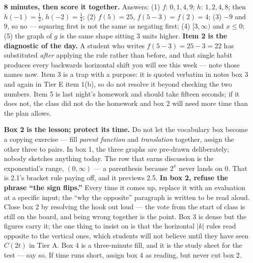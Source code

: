 \documentclass[10pt]{article}
\begin{document}
\boxguard[18]
\begin{teachernote}[Warm-Up]
    \textbf{8 minutes, then score it together.} Answers: (1) $f$: $0,1,4,9$; $h$: $1,2,4,8$; then
    $h(-1)=\tfrac12$, $h(-2)=\tfrac14$; (2) $f(5)=25$, $f(5-3)=f(2)=4$; (3) $-9$ and $9$, so no ---
    squaring first is not the same as negating first; (4) $[3,\infty)$ and $x \le 0$; (5) the graph
    of $g$ is the same shape sitting $3$ units higher. \textbf{Item 2 is the diagnostic of the
    day.} A student who writes $f(5-3)=25-3=22$ has substituted \emph{after} applying the rule
    rather than before, and that single habit produces every backwards horizontal shift you will
    see this week --- note those names now. Item 3 is a trap with a purpose: it is quoted verbatim
    in notes box 3 and again in Tier E item 1(b), so do not resolve it beyond checking the two
    numbers. Item 5 is last night's homework and should take fifteen seconds; if it does not, the
    class did not do the homework and box 2 will need more time than the plan allows.
\end{teachernote}

\boxguard[18]
\begin{teachernote}
    \textbf{Box 2 is the lesson; protect its time.} Do not let the vocabulary box become a copying
    exercise --- fill \emph{parent function} and \emph{translation} together, assign the other
    three to pairs. In box 1, the three graphs are pre-drawn deliberately; nobody sketches anything
    today. The row that earns discussion is the exponential's range, $(0,\infty)$ --- a parenthesis
    because $2^x$ never lands on $0$. That is 2.1's bracket rule paying off, and it previews 2.5.
    \textbf{In box 2, refuse the phrase ``the sign flips.''} Every time it comes up, replace it
    with an evaluation at a specific input; the ``why the opposite'' paragraph is written to be
    read aloud. Close box 2 by resolving the hook out loud --- the vote from the start of class is
    still on the board, and being wrong together is the point. Box 3 is dense but the figures carry
    it; the one thing to insist on is that the horizontal $|k|$ rules read opposite to the vertical
    ones, which students will not believe until they have seen $C(2t)$ in Tier A. Box 4 is a
    three-minute fill, and it is the study sheet for the test --- say so. If time runs short,
    assign box 4 as reading, but never cut box 2.
\end{teachernote}
\end{document}
